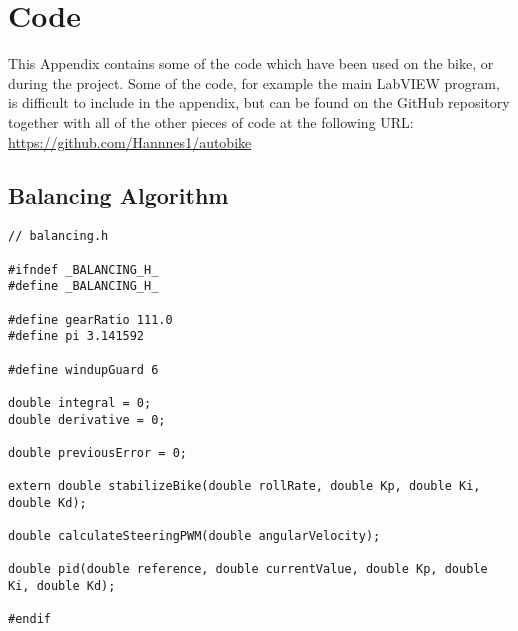 \chapter{Code} \label{code}

This Appendix contains some of the code which have been used on the bike, or during the project. Some of the code, for example the main LabVIEW program, is difficult to include in the appendix, but can be found on the GitHub repository together with all of the other pieces of code at the following URL: \url{https://github.com/Hannnes1/autobike}

\section{Balancing Algorithm} \label{code:balancing}

\begin{lstlisting}
// balancing.h

#ifndef _BALANCING_H_
#define _BALANCING_H_

#define gearRatio 111.0
#define pi 3.141592

#define windupGuard 6

double integral = 0;
double derivative = 0;

double previousError = 0;

extern double stabilizeBike(double rollRate, double Kp, double Ki, double Kd);

double calculateSteeringPWM(double angularVelocity);

double pid(double reference, double currentValue, double Kp, double Ki, double Kd);

#endif
\end{lstlisting}

\newpage

